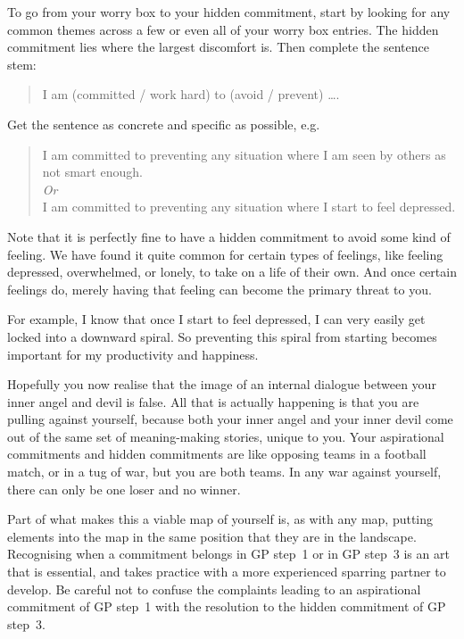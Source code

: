 To go from your worry box to your hidden commitment, start by looking for any common themes across a few or even all of your worry box entries. The hidden commitment lies where the largest discomfort is. Then complete the sentence stem:
 
\begin{quote}
I am (committed / work hard) to (avoid / prevent) \ldots .
\end{quote}


Get the sentence as concrete and specific as possible, e.g. 


\begin{quote} 
I am committed to preventing any situation where I am seen by others as not smart enough. \\ \emph{ Or } \\
I am committed to preventing any situation where I start to feel depressed. 
\end{quote}


Note that it is perfectly fine to have a hidden commitment to avoid some kind of feeling. We have found it quite common for certain types of feelings, like feeling depressed, overwhelmed, or lonely, to take on a life of their own. And once certain feelings do, merely having that feeling can become the primary threat to you. 


For example, I know that once I start to feel depressed, I can very easily get locked into a downward spiral. So preventing this spiral from starting becomes important for my productivity and happiness.


Hopefully you now realise that the image of an internal dialogue between your inner angel and devil is false. All that is actually happening is that you are pulling against yourself, because both your inner angel and your inner devil come out of the same set of meaning-making stories, unique to you. Your aspirational commitments and hidden commitments are like opposing teams in a football match, or in a tug of war, but you are both teams. In any war against yourself, there can only be one loser and no winner.


Part of what makes this a viable map of yourself is, as with any map, putting elements into the map in the same position that they are in the landscape. Recognising when a commitment belongs in GP step~1 or in GP step~3 is an art that is essential, and takes practice with a more experienced sparring partner to develop. Be careful not to confuse the complaints leading to an aspirational commitment of GP step~1 with the resolution to the hidden commitment of GP step~3. 


